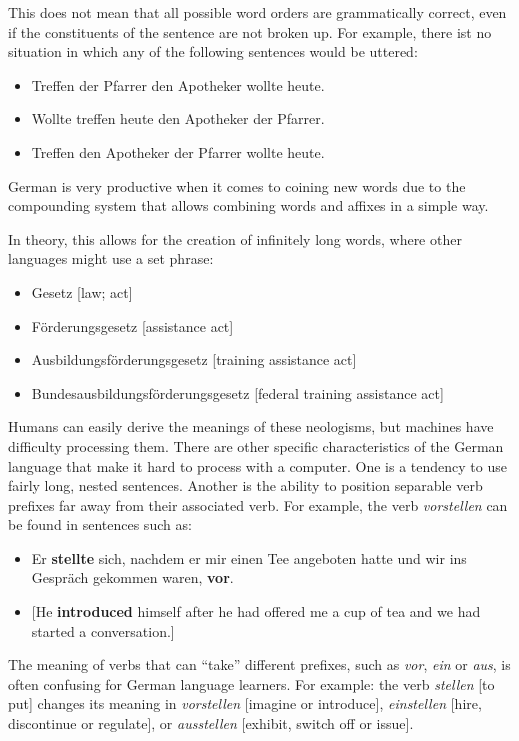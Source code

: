 \begin{multicols}{2}
This does not mean that all possible word orders are grammatically correct, even if the constituents of the sentence are not broken up. For example, there ist no situation in which any of the following sentences would be uttered:

\begin{itemize}
\item \Large*\normalsize Treffen der Pfarrer den Apotheker wollte heute.
\item \Large*\normalsize Wollte treffen heute den Apotheker der Pfarrer. 
\item \Large*\normalsize Treffen den Apotheker der Pfarrer wollte heute.
\end{itemize} 
 
German is very productive when it comes to coining new words due to the compounding system that allows combining words and affixes in a simple way. 

In theory, this allows for the creation of infinitely long words, where other languages might use a set phrase:

\begin{itemize} 
\item Gesetz [law; act]
\item Förderungsgesetz [assistance act] 
\item Ausbildungsförderungsgesetz [training assistance act]
\item Bundesausbildungsförderungsgesetz [federal training assistance act]
\end{itemize}
   
Humans can easily derive the meanings of these neologisms, but machines have difficulty processing them. There are other specific characteristics of the German language that make it hard to process with a computer. One is a tendency to use fairly long, nested sentences. Another is the ability to position separable verb prefixes far away from their associated verb. For example, the verb \textit{vorstellen} can be found in sentences such as:

\begin{itemize}
\item Er \textbf{stellte} sich, nachdem er mir einen Tee angeboten hatte und wir ins Gespräch gekommen waren, \textbf{vor}.
\item {[}He \textbf{introduced} himself after he had offered me a cup of tea and we had started a conversation.{]} 
\end{itemize}

The meaning of verbs that can “take” different prefixes, such as \textit{vor}, \textit{ein} or \textit{aus}, is often confusing for German language learners. For example: the verb \textit{stellen} {[}to put{]} changes its meaning in \textit{vorstellen} {[}imagine or introduce{]}, \textit{einstellen} {[}hire, discontinue or regulate{]}, or \textit{ausstellen} {[}exhibit, switch off or issue{]}.


\end{multicols}
